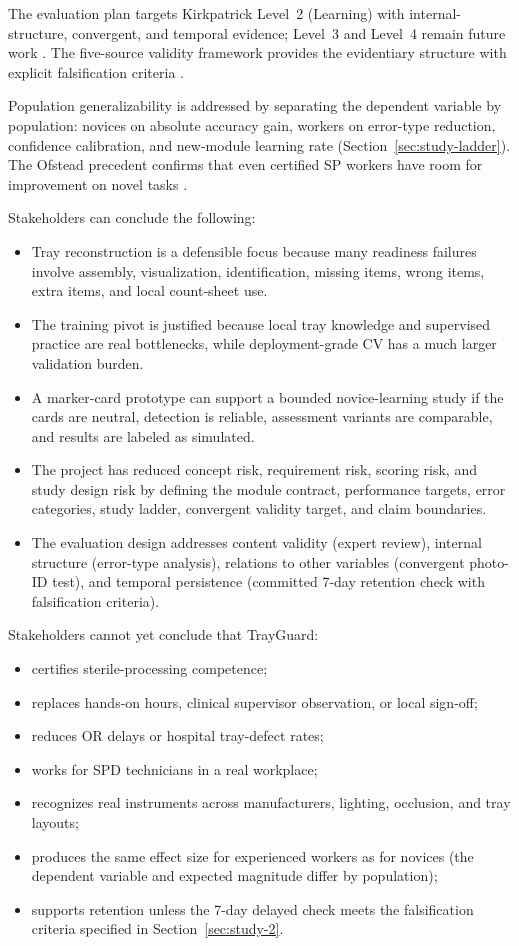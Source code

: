 \documentclass[10pt,a4paper]{article}
\begin{document}
The evaluation plan targets Kirkpatrick Level~2 (Learning) with internal-
structure, convergent, and temporal evidence; Level~3 and Level~4 remain
future work \cite{kirkpatrick-evaluation-1994}. The five-source validity
framework provides the evidentiary structure with explicit falsification
criteria \cite{cook-beckman-validity-2006}.

Population generalizability is addressed by separating the dependent variable by
population: novices on absolute accuracy gain, workers on error-type reduction,
confidence calibration, and new-module learning rate (Section~\ref{sec:study-ladder}).
The Ofstead precedent confirms that even certified SP workers have room for
improvement on novel tasks \cite{ofstead-et-al-2023}.

Stakeholders can conclude the following:
\begin{itemize}
  \item Tray reconstruction is a defensible focus because many readiness failures involve assembly, visualization, identification, missing items, wrong items, extra items, and local count-sheet use.
  \item The training pivot is justified because local tray knowledge and supervised practice are real bottlenecks, while deployment-grade CV has a much larger validation burden.
  \item A marker-card prototype can support a bounded novice-learning study if the cards are neutral, detection is reliable, assessment variants are comparable, and results are labeled as simulated.
  \item The project has reduced concept risk, requirement risk, scoring risk, and study design risk by defining the module contract, performance targets, error categories, study ladder, convergent validity target, and claim boundaries.
  \item The evaluation design addresses content validity (expert review), internal structure (error-type analysis), relations to other variables (convergent photo-ID test), and temporal persistence (committed 7-day retention check with falsification criteria).
\end{itemize}
Stakeholders cannot yet conclude that TrayGuard:
\begin{itemize}
  \item certifies sterile-processing competence;
  \item replaces hands-on hours, clinical supervisor observation, or local sign-off;
  \item reduces OR delays or hospital tray-defect rates;
  \item works for SPD technicians in a real workplace;
  \item recognizes real instruments across manufacturers, lighting, occlusion, and tray layouts;
  \item produces the same effect size for experienced workers as for novices (the dependent variable and expected magnitude differ by population);
  \item supports retention unless the 7-day delayed check meets the falsification criteria specified in Section~\ref{sec:study-2}.
\end{itemize}
\end{document}
